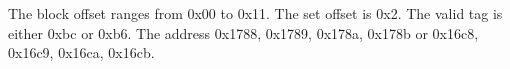 \documentclass{article}
\begin{document}
The block offset ranges from 0x00 to 0x11.
The set offset is 0x2.
The valid tag is either 0xbc or 0xb6.
The address 0x1788, 0x1789, 0x178a, 0x178b or 0x16c8, 0x16c9, 0x16ca, 0x16cb.
\end{document}
